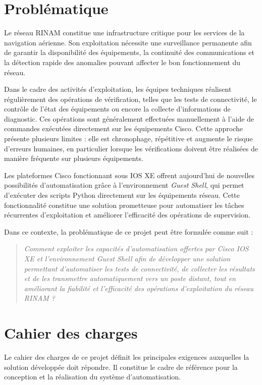 \documentclass[12pt, a4paper, oneside]{report}
\begin{document}
\section{Problématique}

Le réseau \ac{RINAM} constitue une infrastructure critique pour les services de la navigation aérienne. 
Son exploitation nécessite une surveillance permanente afin de garantir la disponibilité des équipements, 
la continuité des communications et la détection rapide des anomalies pouvant affecter le bon 
fonctionnement du réseau.

Dans le cadre des activités d'exploitation, les équipes techniques réalisent régulièrement des 
opérations de vérification, telles que les tests de connectivité, le contrôle de l'état des 
équipements ou encore la collecte d'informations de diagnostic. Ces opérations sont généralement 
effectuées manuellement à l'aide de commandes exécutées directement sur les équipements Cisco. 
Cette approche présente plusieurs limites : elle est chronophage, répétitive et augmente le risque 
d'erreurs humaines, en particulier lorsque les vérifications doivent être réalisées de manière 
fréquente sur plusieurs équipements.

Les plateformes Cisco fonctionnant sous \ac{IOS XE} offrent aujourd'hui de nouvelles possibilités 
d'automatisation grâce à l'environnement \textit{Guest Shell}, qui permet d'exécuter des scripts 
Python directement sur les équipements réseau. Cette fonctionnalité constitue une solution prometteuse 
pour automatiser les tâches récurrentes d'exploitation et améliorer l'efficacité des opérations de supervision.

Dans ce contexte, la problématique de ce projet peut être formulée comme suit :

\begin{quote}
\itshape
Comment exploiter les capacités d'automatisation offertes par Cisco IOS XE et l'environnement 
Guest Shell afin de développer une solution permettant d'automatiser les tests de connectivité, 
de collecter les résultats et de les transmettre automatiquement vers un poste distant, tout en 
améliorant la fiabilité et l'efficacité des opérations d'exploitation du réseau RINAM ?
\end{quote}


\section{Cahier des charges}

Le cahier des charges de ce projet définit les principales exigences auxquelles la solution 
développée doit répondre. Il constitue le cadre de référence pour la conception et la réalisation 
du système d'automatisation.
\end{document}

